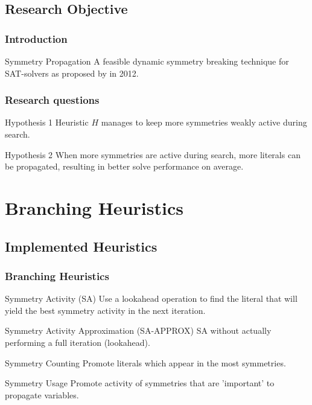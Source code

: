 \documentclass{beamer}
\begin{document}
	\subsection{Research Objective}
	\begin{frame}
		\frametitle{Introduction}
		\begin{block}{Symmetry Propagation}
			A feasible dynamic symmetry breaking technique for SAT-solvers as proposed by
			\cite{devriendt2012symmetry} in 2012.
		\end{block}
	\end{frame}

	\begin{frame}
		\frametitle{Research questions}
		\begin{block}{Hypothesis 1}
			\label{hyp:increased_activity}
			Heuristic $H$ manages to keep more symmetries weakly active during search.
		\end{block}
		
		\begin{block}{Hypothesis 2}
			\label{hyp:activity_equals_speed}
			When more symmetries are active during search, more literals can be propagated, resulting in
			better solve performance on average.
		\end{block}
	\end{frame}

\section{Branching Heuristics}

	\subsection{Implemented Heuristics}
	\begin{frame}%
		\frametitle{Branching Heuristics}

		\begin{block}{Symmetry Activity (SA)}
			Use a lookahead operation to find the literal that will yield the best symmetry activity
			in the next iteration.
		\end{block}

		\begin{block}{Symmetry Activity Approximation (SA-APPROX)}
			SA without actually performing a full iteration (lookahead).
		\end{block}

		\begin{block}{Symmetry Counting}
			Promote literals which appear in the most symmetries.
		\end{block}

		\begin{block}{Symmetry Usage}
			Promote activity of symmetries that are
			'important' to propagate variables.
		\end{block}
	\end{frame}
\end{document}
